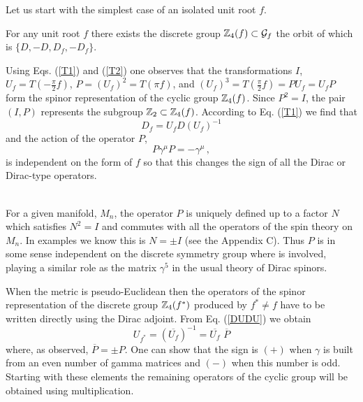 \documentclass[a4paper,12pt]{article}
\begin{document}
Let us start with the simplest case of an isolated unit root $f$. 
\begin{theor}\label{D1}
For any unit root $f$ there exists the discrete group 
${\Bbb  Z}_4(f)\subset {\cal G}_f$ the orbit of which is $\{D,-D,D_f,-D_f\}$.
\end{theor}
\begin{demo}
Using Eqs. (\ref{T1}) and (\ref{T2}) one observes that the transformations 
$I$, $U_f=T(-\frac{\pi}{2}f)$, $P=(U_f)^2=T(\pi f)$, and 
$(U_f)^3 = T(\frac{\pi}{2}f)=PU_f=U_f P$ form the spinor representation of 
the cyclic group ${\Bbb  Z}_4(f)$. Since  $P^2=I$, the pair $(I, P)$ represents 
the subgroup ${\Bbb  Z}_2\subset {\Bbb  Z}_4(f)$. According to Eq. (\ref{T1}) 
we find that    
\begin{equation}\label{DUDU}
D_f=U_f D(U_f)^{-1}
\end{equation}
and the action of the operator $P$, 
\begin{equation}\label{pari}
P\gamma^{\mu}P=-\gamma^{\mu}\,,  
\end{equation}
is independent on the form of $f$ so that this changes the sign of all the 
Dirac or Dirac-type  operators.  
\end{demo}\\ 
For a given manifold, $M_n$, the operator $P$ is uniquely defined up to a 
factor $N$ which satisfies $N^2=I$ and commutes with all the operators of the 
spin theory on $M_n$. In examples we know this is $N=\pm I$ 
(see the Appendix C). 
Thus $P$ is in some sense independent on the discrete symmetry group where is 
involved, playing a similar role as the matrix $\gamma^5$ in the usual theory 
of Dirac spinors. 

When the metric is pseudo-Euclidean then the operators of the spinor 
representation of the discrete group ${\Bbb Z}_4(f^*)$ produced by 
$f^*\not =f$ have to be written directly using the Dirac adjoint. From 
Eq. (\ref{DUDU}) we obtain 
\begin{equation}
U_{f^*}=(\overline{U_f})^{-1}=\overline{U_f}\,\,\overline{P}
\end{equation}
where, as observed, $\overline{P}=\pm P$. One can show that the sign is $(+)$   
when $\gamma$ is built from an even number of gamma matrices and $(-)$ when 
this number is odd. Starting with these elements  the remaining operators of 
the cyclic group will be obtained using multiplication. 
\end{document}
